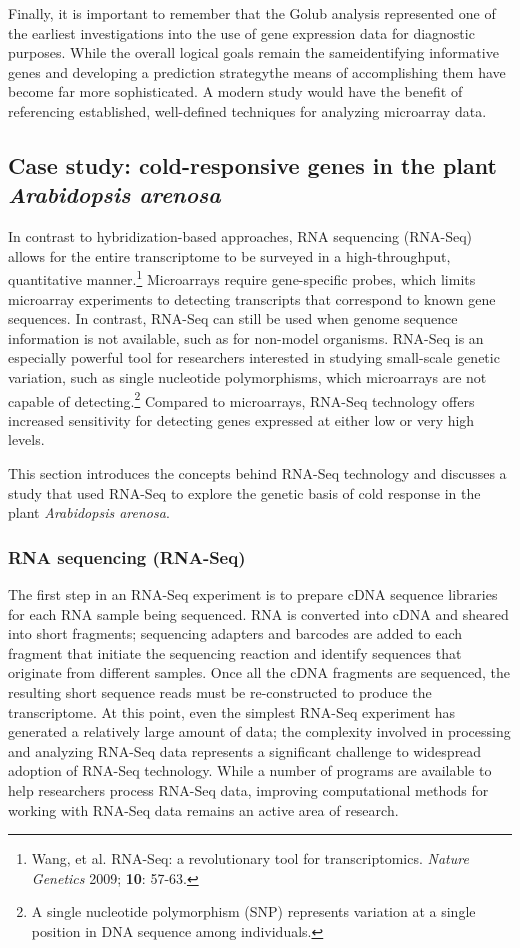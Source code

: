 Finally, it is important to remember that the Golub analysis represented one of the earliest investigations into the use of gene expression data for diagnostic purposes. While the overall logical goals remain the same\textemdash identifying informative genes and developing a prediction strategy\textemdash the means of accomplishing them have become far more sophisticated. A modern study would have the benefit of referencing established, well-defined techniques for analyzing microarray data.



\subsection{Case study: cold-responsive genes in the plant \textit{Arabidopsis arenosa}}

In contrast to hybridization-based approaches, RNA sequencing (RNA-Seq) allows for the entire transcriptome to be surveyed in a high-throughput, quantitative manner.\footnote{Wang, et al. RNA-Seq: a revolutionary tool for transcriptomics. \textit{Nature Genetics} 2009; \textbf{10}: 57-63.} Microarrays require gene-specific probes, which limits microarray experiments to detecting transcripts that correspond to known gene sequences. In contrast, RNA-Seq can still be used when genome sequence information is not available, such as for non-model organisms. RNA-Seq is an especially powerful tool for researchers interested in studying small-scale genetic variation, such as single nucleotide polymorphisms, which microarrays are not capable of detecting.\footnote{A single nucleotide polymorphism (SNP) represents variation at a single position in DNA sequence among individuals.} Compared to microarrays, RNA-Seq technology offers increased sensitivity for detecting genes expressed at either low or very high levels.

This section introduces the concepts behind RNA-Seq technology and discusses a study that used RNA-Seq to explore the genetic basis of cold response in the plant \textit{Arabidopsis arenosa}.

\subsubsection{RNA sequencing (RNA-Seq)}

The first step in an RNA-Seq experiment is to prepare cDNA sequence libraries for each RNA sample being sequenced. RNA is converted into cDNA and sheared into short fragments; sequencing adapters and barcodes are added to each fragment that initiate the sequencing reaction and identify sequences that originate from different samples. Once all the cDNA fragments are sequenced, the resulting short sequence reads must be re-constructed to produce the transcriptome. At this point, even the simplest RNA-Seq experiment has generated a relatively large amount of data; the complexity involved in processing and analyzing RNA-Seq data represents a significant challenge to widespread adoption of RNA-Seq technology. While a number of programs are available to help researchers process RNA-Seq data, improving computational methods for working with RNA-Seq data remains an active area of research.


